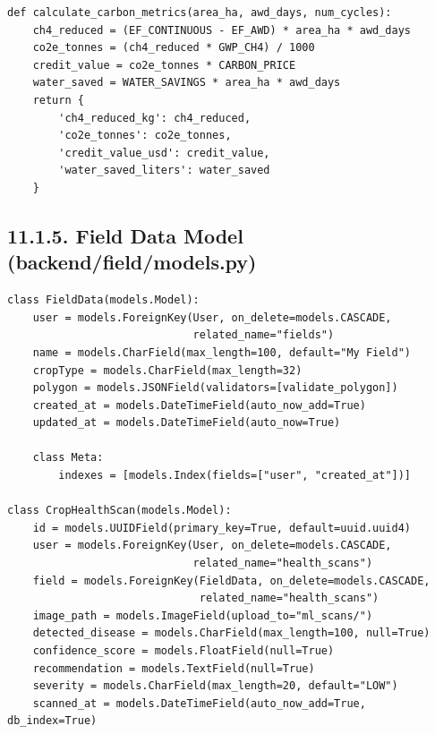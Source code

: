 \documentclass[12pt, a4paper]{report}
\begin{document}
\begin{enumerate}[leftmargin=*]
\begin{enumerate}[leftmargin=*]
\begin{Verbatim}[fontsize=\small]
def calculate_carbon_metrics(area_ha, awd_days, num_cycles):
    ch4_reduced = (EF_CONTINUOUS - EF_AWD) * area_ha * awd_days
    co2e_tonnes = (ch4_reduced * GWP_CH4) / 1000
    credit_value = co2e_tonnes * CARBON_PRICE
    water_saved = WATER_SAVINGS * area_ha * awd_days
    return {
        'ch4_reduced_kg': ch4_reduced,
        'co2e_tonnes': co2e_tonnes,
        'credit_value_usd': credit_value,
        'water_saved_liters': water_saved
    }
\end{Verbatim}
\subsection{11.1.5. Field Data Model (backend/field/models.py)}
\begin{Verbatim}[fontsize=\small]
class FieldData(models.Model):
    user = models.ForeignKey(User, on_delete=models.CASCADE,
                             related_name="fields")
    name = models.CharField(max_length=100, default="My Field")
    cropType = models.CharField(max_length=32)
    polygon = models.JSONField(validators=[validate_polygon])
    created_at = models.DateTimeField(auto_now_add=True)
    updated_at = models.DateTimeField(auto_now=True)

    class Meta:
        indexes = [models.Index(fields=["user", "created_at"])]

class CropHealthScan(models.Model):
    id = models.UUIDField(primary_key=True, default=uuid.uuid4)
    user = models.ForeignKey(User, on_delete=models.CASCADE,
                             related_name="health_scans")
    field = models.ForeignKey(FieldData, on_delete=models.CASCADE,
                              related_name="health_scans")
    image_path = models.ImageField(upload_to="ml_scans/")
    detected_disease = models.CharField(max_length=100, null=True)
    confidence_score = models.FloatField(null=True)
    recommendation = models.TextField(null=True)
    severity = models.CharField(max_length=20, default="LOW")
    scanned_at = models.DateTimeField(auto_now_add=True, db_index=True)
\end{Verbatim}

\end{enumerate}
\end{enumerate}
\end{document}
